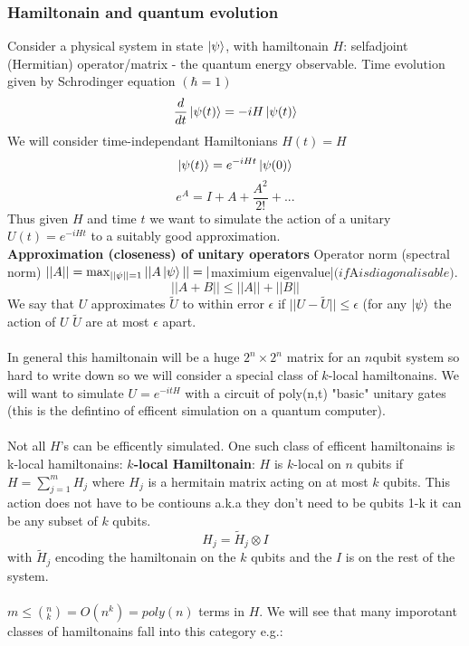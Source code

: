 \documentclass{article}
\begin{document}
       \subsubsection{Hamiltonain and quantum evolution}
       Consider a physical system  in state $\ket{\psi}$, with hamiltonain $H$: selfadjoint (Hermitian) operator/matrix - the quantum energy observable. Time evolution given by Schrodinger equation $(\hbar = 1)$ 
       $$
       \frac{d}{dt} \ket{\psi(t)} = - i H \ket{\psi(t)}
       $$
       We will consider time-independant Hamiltonians $H(t) = H$
       $$
       \ket{\psi(t)} = e^{-iHt} \ket{\psi(0)}
       $$
       $$
       e^A = I + A + \frac{A^2}{2!} + ...
       $$
       Thus given $H$ and time $t$ we want to simulate the action of a unitary $U(t) = e^{-i Ht}$ to a suitably good approximation.\\
       \textbf{Approximation (closeness) of unitary operators}
       Operator norm (spectral norm) $||A|| = \max_{||\psi|| = 1} ||A\ket{\psi}|| = |$maximium eigenvalue|$ (if $A$ is diagonalisable)$.
       $$
       ||A+B|| \leq ||A|| + ||B||
       $$
       We say that $U$ approximates $\tilde U$ to within error $\epsilon$ if $||U - \tilde U|| \leq \epsilon$ (for any $\ket{\psi}$ the action of $U$ $\tilde U$ are at most $\epsilon$ apart.\\\\
       In general this hamiltonain will be a huge $2^n\times 2^n$ matrix for an $n$qubit system so hard to write down so we will consider a special class of $k$-local hamiltonains. We will want to simulate $U = e^{- i tH}$ with a circuit of poly(n,t) "basic" unitary gates (this is the defintino of efficent simulation on a quantum computer).\\\\
       Not all $H$'s can be efficently simulated. One such class of efficent hamiltonains is k-local hamiltonains:
                       \textbf{$k$-local Hamiltonain}: $H$ is $k$-local on $n$ qubits if $H= \sum_{j=1}^m H_j$ where $H_j$ is a hermitain matrix acting on at most $k$ qubits. This action does not have to be contiouns a.k.a they don't need to be qubits 1-k it can be any subset of $k$ qubits.
                       $$
                       H_j = \tilde H_j \otimes I
                       $$
                       with $\tilde H_j$ encoding the hamiltonain on the $k$ qubits and the $I$ is on the rest of the system.\\\\
                       $m \leq (^n_k) = O(n^k) = poly(n)$ terms in $H$. We will see that many imporotant classes of hamiltonains fall into this category e.g.:\\
\end{document}
